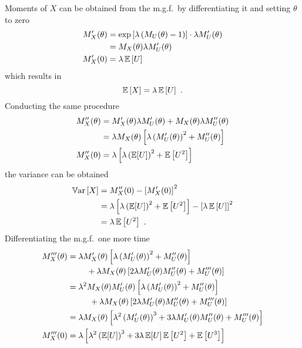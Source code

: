 Moments of $X$ can be obtained from the m.g.f.~by differentiating it and setting $\theta$ to zero
\begin{align}
  M_X'(\theta)&=\exp\left[\lambda\left(M_U(\theta)-1\right)\right]\cdot\lambda M_U'(\theta)
  \nonumber\\
  &=M_X(\theta)\lambda M_U'(\theta)
  \\
  M_X'(0)&=\lambda\operatorname{\mathbb{E}}\left[U\right]
\end{align}
which results in
\begin{equation}
  \operatorname{\mathbb{E}}\left[X\right]=\lambda\operatorname{\mathbb{E}}\left[U\right]
  \ .
\end{equation}
Conducting the same procedure
\begin{align}
  M_X''(\theta)&=M_X'(\theta)\lambda M_U'(\theta)+M_X(\theta)\lambda M_U''(\theta)
  \nonumber\\
  &=\lambda M_X(\theta)\left[
    \lambda\left(M_U'(\theta)\right)^2+M_U''(\theta)
  \right]
  \\
  M_X''(0)&=\lambda\left[\lambda\left(\operatorname{\mathbb{E}}[U]\right)^2+\operatorname{\mathbb{E}}\left[U^2\right]\right]
\end{align}
the variance can be obtained
\begin{align}
  \operatorname{\mathbb{V}ar}\left[X\right]&=M_X''(0)-\left[M_X'(0)\right]^2
  \nonumber \\
  &=\lambda\left[\lambda\left(\operatorname{\mathbb{E}}[U]\right)^2+\operatorname{\mathbb{E}}\left[U^2\right]\right]-\left[\lambda\operatorname{\mathbb{E}}\left[U\right]\right]^2
  \nonumber \\
  &=\lambda\operatorname{\mathbb{E}}\left[U^2\right] \ .
\end{align}
Differentiating the m.g.f.~one more time
\begin{align}
  M_X'''(\theta) &=
  \begin{multlined}[t]
    \lambda M_X'(\theta)\left[
      \lambda\left(M_U'(\theta)\right)^2+M_U''(\theta)
    \right]
    \\+
    \lambda M_X(\theta)\left[
      2\lambda M_U'(\theta)M_U''(\theta)+M_U'''(\theta)
    \right]
  \end{multlined}
  \nonumber \\
  &=
  \begin{multlined}[t]
    \lambda^2 M_X(\theta)M_U'(\theta)\left[
      \lambda\left(M_U'(\theta)\right)^2+M_U''(\theta)
    \right]
    \\+
    \lambda M_X(\theta)\left[
      2\lambda M_U'(\theta)M_U''(\theta)+M_U'''(\theta)
    \right]
  \end{multlined}
  \nonumber \\
  &=
  \lambda M_X(\theta)\left[
    \lambda^2 \left(M_U'(\theta)\right)^3 + 3\lambda M_U'(\theta)M_U''(\theta) + M_U'''(\theta)
  \right]
  \\
  M_X'''(0) &=
  \lambda \left[
    \lambda^2 \left(\expectation[U]\right)^3 + 3\lambda \expectation[U]\expectation\left[U^2\right] + \expectation\left[U^3\right]
  \right]
\end{align}

